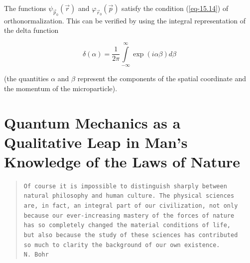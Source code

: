 \documentclass[a4paper,sfsidenotes,colorlinks=true]{tufte-book}
\numberwithin{equation}{section}
\numberwithin{figure}{section}
\begin{document}
The functions $\psi_{\vec{p}_{0}} (\vec{r})$ and
$\varphi_{\vec{r}_{0}} (\vec{p})$ satisfy the condition
(\ref{eq-15.14}) of orthonormalization. This can be verified by using
the integral representation of the delta function

\begin{equation}%
\delta (\alpha) = \frac{1}{2 \pi} \int\limits_{-\infty}^\infty \exp (i \alpha \beta) d \beta
\label{eq-15.17}
\end{equation}

(the quantities $\alpha$ and $\beta$ represent the components of the spatial
coordinate and the momentum of the microparticle).




\section{Quantum Mechanics as a Qualitative Leap in Man's Knowledge of
  the Laws of Nature}
\label{sec-16}
\vspace*{10pt}
\begin{fullwidth}
\begin{verse}
  \texttt{\small Of course it is impossible to distinguish sharply
    between \\
    natural philosophy and human culture. The physical sciences \\
    are, in fact, an integral part of our civilization, not only \\
    because  our ever-increasing mastery of the forces of nature \\
    has so completely changed the material conditions of life, \\
    but also because the study of these sciences has contributed \\
    so much to clarity the background of our own existence.}\\[8pt]

\texttt{\small \hspace{11cm}N. Bohr}

\end{verse}
\end{fullwidth}
\end{document}
